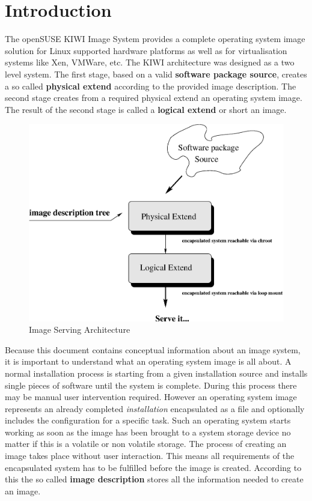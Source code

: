 \chapter{Introduction}

The openSUSE KIWI Image System provides a complete operating system
image solution for Linux supported hardware platforms as well as
for virtualisation systems like Xen, VMWare, etc. The KIWI architecture
was designed as a two level system. The first stage, based on a valid
\textbf{software package source}, creates a so called \textbf{physical extend}
according to the provided image description. The second stage creates from
a required physical extend an operating system image. The result of the
second stage is called a \textbf{logical extend} or short an image.

\begin{figure}[h]
\centering
\includegraphics[scale=0.5]{pictures/intro.eps}
\caption{Image Serving Architecture}
\label{fig:architecture}
\end{figure}

Because this document contains conceptual information about an image system,
it is important to understand what an operating system image is all about.
A normal installation process is starting from a given installation source
and installs single pieces of software until the system is complete. During
this process there may be manual user intervention required. However an
operating system image represents an already completed \textit{installation}
encapsulated as a file and optionally includes the configuration for a
specific task. Such an operating system starts working as soon as the
image has been brought to a system storage device no matter if this is a
volatile or non volatile storage. The process of creating an image takes
place without user interaction.
This means all requirements of the encapsulated system has to be fulfilled
before the image is created. According to this the so called
\textbf{image description} stores all the information needed to
create an image.

